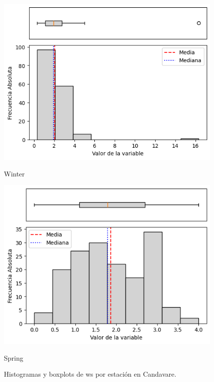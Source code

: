 \begin{figure}[htbp]
\begin{minipage}{0.30\textwidth}
  \includegraphics[width=\linewidth]{resultados/por_estacion_del_anio/boxplot_clases_por_estacion/Candavare/WS_HistBoxplot_Winter.png}
  \caption*{Winter}
\end{minipage}
\hfill
\begin{minipage}{0.30\textwidth}
  \includegraphics[width=\linewidth]{resultados/por_estacion_del_anio/boxplot_clases_por_estacion/Candavare/WS_HistBoxplot_Spring.png}
  \caption*{Spring}
\end{minipage}
\caption{Histogramas y boxplots de \gls{ws}  por estación en Candavare.}
\label{fig:candavare_ws_hist}
\end{figure}

